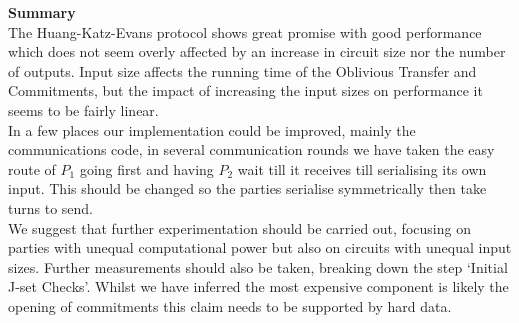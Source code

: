 \documentclass[11pt]{article} %
\begin{document}
				\noindent\textbf{Summary}\\

				The Huang-Katz-Evans protocol shows great promise with good performance which does not seem overly affected by an increase in circuit size nor the number of outputs. Input size affects the running time of the Oblivious Transfer and Commitments, but the impact of increasing the input sizes on performance it seems to be fairly linear.\\

				In a few places our implementation could be improved, mainly the communications code, in several communication rounds we have taken the easy route of $P_1$ going first and having $P_2$ wait till it receives till serialising its own input. This should be changed so the parties serialise symmetrically then take turns to send.\\

				We suggest that further experimentation should be carried out, focusing on parties with unequal computational power but also on circuits with unequal input sizes. Further measurements should also be taken, breaking down the step `Initial J-set Checks'. Whilst we have inferred the most expensive component is likely the opening of commitments this claim needs to be supported by hard data.
\end{document}
